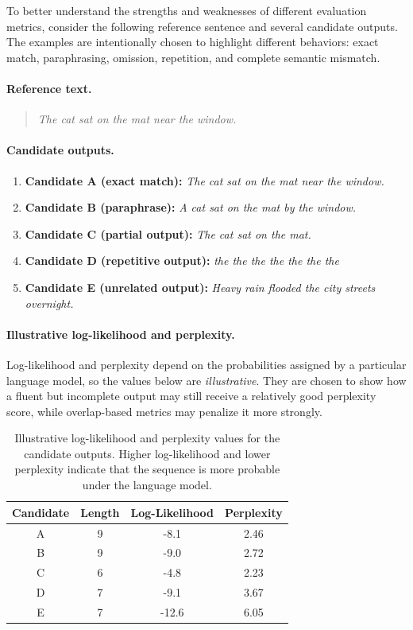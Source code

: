 \documentclass{article}
\begin{document}
To better understand the strengths and weaknesses of different evaluation metrics, consider the following reference sentence and several candidate outputs. The examples are intentionally chosen to highlight different behaviors: exact match, paraphrasing, omission, repetition, and complete semantic mismatch.

\paragraph{Reference text.}
\begin{quote}
\textit{The cat sat on the mat near the window.}
\end{quote}

\paragraph{Candidate outputs.}
\begin{enumerate}
    \item \textbf{Candidate A (exact match):} \textit{The cat sat on the mat near the window.}
    \item \textbf{Candidate B (paraphrase):} \textit{A cat sat on the mat by the window.}
    \item \textbf{Candidate C (partial output):} \textit{The cat sat on the mat.}
    \item \textbf{Candidate D (repetitive output):} \textit{the the the the the the the}
    \item \textbf{Candidate E (unrelated output):} \textit{Heavy rain flooded the city streets overnight.}
\end{enumerate}

\paragraph{Illustrative log-likelihood and perplexity.}
Log-likelihood and perplexity depend on the probabilities assigned by a particular language model, so the values below are \emph{illustrative}. They are chosen to show how a fluent but incomplete output may still receive a relatively good perplexity score, while overlap-based metrics may penalize it more strongly.

\begin{table}[H]
\centering
\begin{tabular}{|c|c|c|c|}
\hline
\textbf{Candidate} & \textbf{Length} & \textbf{Log-Likelihood} & \textbf{Perplexity} \\
\hline
A & 9 & -8.1 & 2.46 \\
B & 9 & -9.0 & 2.72 \\
C & 6 & -4.8 & 2.23 \\
D & 7 & -9.1 & 3.67 \\
E & 7 & -12.6 & 6.05 \\
\hline
\end{tabular}
\caption{Illustrative log-likelihood and perplexity values for the candidate outputs. Higher log-likelihood and lower perplexity indicate that the sequence is more probable under the language model.}
\label{tab:llm_metric_example_ll}
\end{table}
\end{document}
